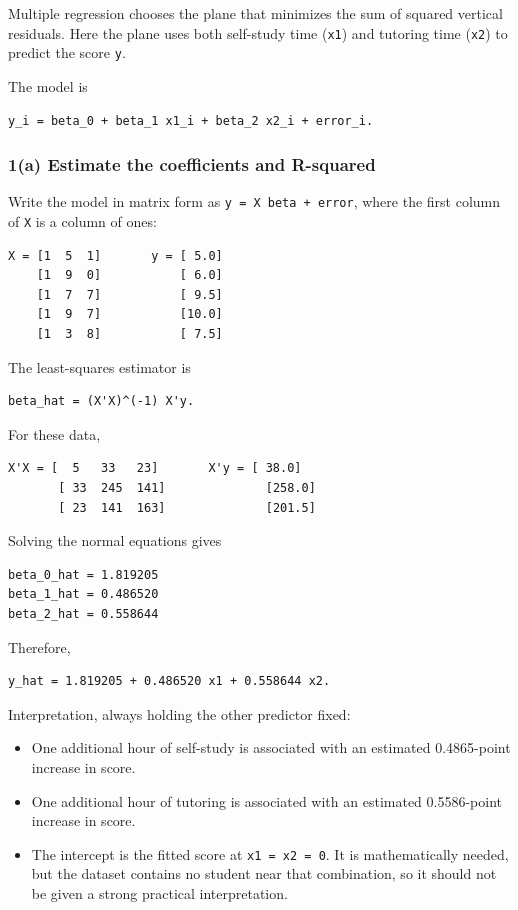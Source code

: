 ﻿\documentclass[11pt]{article}
\begin{document}
Multiple regression chooses the plane that minimizes the sum of squared vertical
residuals. Here the plane uses both self-study time (\texttt{x1}) and tutoring time
(\texttt{x2}) to predict the score \texttt{y}.

The model is

\begin{lstlisting}
y_i = beta_0 + beta_1 x1_i + beta_2 x2_i + error_i.
\end{lstlisting}

\subsubsection{1(a) Estimate the coefficients and R-squared}

Write the model in matrix form as \texttt{y = X beta + error}, where the first column
of \texttt{X} is a column of ones:

\begin{lstlisting}
X = [1  5  1]       y = [ 5.0]
    [1  9  0]           [ 6.0]
    [1  7  7]           [ 9.5]
    [1  9  7]           [10.0]
    [1  3  8]           [ 7.5]
\end{lstlisting}

The least-squares estimator is

\begin{lstlisting}
beta_hat = (X'X)^(-1) X'y.
\end{lstlisting}

For these data,

\begin{lstlisting}
X'X = [  5   33   23]       X'y = [ 38.0]
       [ 33  245  141]              [258.0]
       [ 23  141  163]              [201.5]
\end{lstlisting}

Solving the normal equations gives

\begin{lstlisting}
beta_0_hat = 1.819205
beta_1_hat = 0.486520
beta_2_hat = 0.558644
\end{lstlisting}

Therefore,

\begin{lstlisting}
y_hat = 1.819205 + 0.486520 x1 + 0.558644 x2.
\end{lstlisting}

Interpretation, always holding the other predictor fixed:

\begin{itemize}
\item One additional hour of self-study is associated with an estimated 0.4865-point
increase in score.
\item One additional hour of tutoring is associated with an estimated 0.5586-point
increase in score.
\item The intercept is the fitted score at \texttt{x1 = x2 = 0}. It is mathematically needed,
but the dataset contains no student near that combination, so it should not be
given a strong practical interpretation.
\end{itemize}
\end{document}
